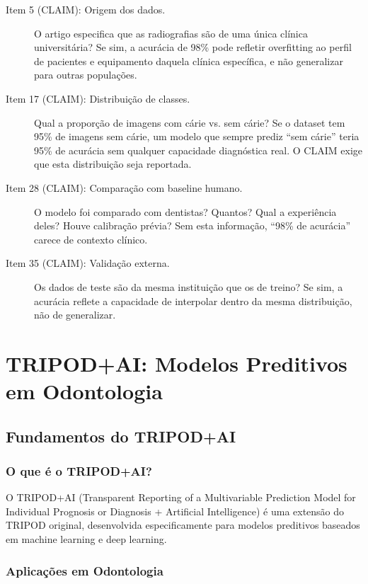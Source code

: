 \begin{description}
    \item[Item 5 (CLAIM): Origem dos dados.] O artigo especifica que as radiografias são de uma única clínica universitária? Se sim, a acurácia de 98\% pode refletir overfitting ao perfil de pacientes e equipamento daquela clínica específica, e não generalizar para outras populações.
    \item[Item 17 (CLAIM): Distribuição de classes.] Qual a proporção de imagens com cárie vs. sem cárie? Se o dataset tem 95\% de imagens sem cárie, um modelo que sempre prediz ``sem cárie'' teria 95\% de acurácia sem qualquer capacidade diagnóstica real. O CLAIM exige que esta distribuição seja reportada.
    \item[Item 28 (CLAIM): Comparação com baseline humano.] O modelo foi comparado com dentistas? Quantos? Qual a experiência deles? Houve calibração prévia? Sem esta informação, ``98\% de acurácia'' carece de contexto clínico.
    \item[Item 35 (CLAIM): Validação externa.] Os dados de teste são da mesma instituição que os de treino? Se sim, a acurácia reflete a capacidade de interpolar dentro da mesma distribuição, não de generalizar.
\end{description}

\section{TRIPOD+AI: Modelos Preditivos em Odontologia}

\subsection{Fundamentos do TRIPOD+AI}

\subsubsection{O que é o TRIPOD+AI?}

O TRIPOD+AI  (Transparent Reporting of a Multivariable Prediction Model for Individual Prognosis or Diagnosis + Artificial Intelligence) é uma extensão do TRIPOD original, desenvolvida especificamente para modelos preditivos baseados em machine learning e deep learning.

\subsubsection{Aplicações em Odontologia}

